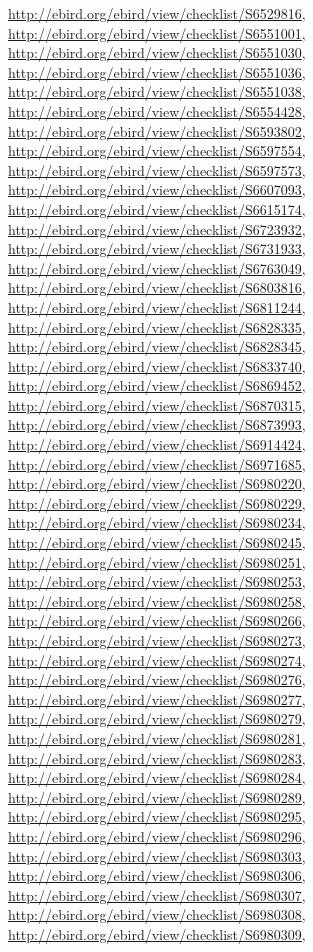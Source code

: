 \documentclass[9pt, article]{memoir}
\begin{document}
\begin{multicols}{2}
\url{http://ebird.org/ebird/view/checklist/S6529816}, 
\url{http://ebird.org/ebird/view/checklist/S6551001}, 
\url{http://ebird.org/ebird/view/checklist/S6551030}, 
\url{http://ebird.org/ebird/view/checklist/S6551036}, 
\url{http://ebird.org/ebird/view/checklist/S6551038}, 
\url{http://ebird.org/ebird/view/checklist/S6554428}, 
\url{http://ebird.org/ebird/view/checklist/S6593802}, 
\url{http://ebird.org/ebird/view/checklist/S6597554}, 
\url{http://ebird.org/ebird/view/checklist/S6597573}, 
\url{http://ebird.org/ebird/view/checklist/S6607093}, 
\url{http://ebird.org/ebird/view/checklist/S6615174}, 
\url{http://ebird.org/ebird/view/checklist/S6723932}, 
\url{http://ebird.org/ebird/view/checklist/S6731933}, 
\url{http://ebird.org/ebird/view/checklist/S6763049}, 
\url{http://ebird.org/ebird/view/checklist/S6803816}, 
\url{http://ebird.org/ebird/view/checklist/S6811244}, 
\url{http://ebird.org/ebird/view/checklist/S6828335}, 
\url{http://ebird.org/ebird/view/checklist/S6828345}, 
\url{http://ebird.org/ebird/view/checklist/S6833740}, 
\url{http://ebird.org/ebird/view/checklist/S6869452}, 
\url{http://ebird.org/ebird/view/checklist/S6870315}, 
\url{http://ebird.org/ebird/view/checklist/S6873993}, 
\url{http://ebird.org/ebird/view/checklist/S6914424}, 
\url{http://ebird.org/ebird/view/checklist/S6971685}, 
\url{http://ebird.org/ebird/view/checklist/S6980220}, 
\url{http://ebird.org/ebird/view/checklist/S6980229}, 
\url{http://ebird.org/ebird/view/checklist/S6980234}, 
\url{http://ebird.org/ebird/view/checklist/S6980245}, 
\url{http://ebird.org/ebird/view/checklist/S6980251}, 
\url{http://ebird.org/ebird/view/checklist/S6980253}, 
\url{http://ebird.org/ebird/view/checklist/S6980258}, 
\url{http://ebird.org/ebird/view/checklist/S6980266}, 
\url{http://ebird.org/ebird/view/checklist/S6980273}, 
\url{http://ebird.org/ebird/view/checklist/S6980274}, 
\url{http://ebird.org/ebird/view/checklist/S6980276}, 
\url{http://ebird.org/ebird/view/checklist/S6980277}, 
\url{http://ebird.org/ebird/view/checklist/S6980279}, 
\url{http://ebird.org/ebird/view/checklist/S6980281}, 
\url{http://ebird.org/ebird/view/checklist/S6980283}, 
\url{http://ebird.org/ebird/view/checklist/S6980284}, 
\url{http://ebird.org/ebird/view/checklist/S6980289}, 
\url{http://ebird.org/ebird/view/checklist/S6980295}, 
\url{http://ebird.org/ebird/view/checklist/S6980296}, 
\url{http://ebird.org/ebird/view/checklist/S6980303}, 
\url{http://ebird.org/ebird/view/checklist/S6980306}, 
\url{http://ebird.org/ebird/view/checklist/S6980307}, 
\url{http://ebird.org/ebird/view/checklist/S6980308}, 
\url{http://ebird.org/ebird/view/checklist/S6980309}, 

\end{multicols}
\end{document}
